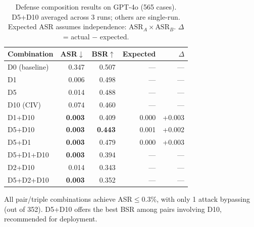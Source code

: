 \begin{table}[t]
\centering
\small
\caption{Defense composition results on GPT-4o (565 cases). D5+D10 averaged across 3 runs; others are single-run. Expected ASR assumes independence: $\text{ASR}_A \times \text{ASR}_B$. $\Delta$ = actual $-$ expected.}
\label{tab:composition}
\begin{tabular}{l rr r r}
\toprule
Combination & ASR$\downarrow$ & BSR$\uparrow$ & Expected & $\Delta$ \\
\midrule
D0 (baseline)       & 0.347 & 0.507 & ---    & ---    \\
D1                   & 0.006 & 0.498 & ---    & ---    \\
D5                   & 0.014 & 0.488 & ---    & ---    \\
D10 (CIV)            & 0.074 & 0.460 & ---    & ---    \\
\midrule
D1+D10               & \textbf{0.003} & 0.409 & 0.000  & +0.003 \\
D5+D10               & \textbf{0.003} & \textbf{0.443} & 0.001  & +0.002 \\
D5+D1                & \textbf{0.003} & 0.479 & 0.000  & +0.003 \\
\midrule
D5+D1+D10            & \textbf{0.003} & 0.394 & ---    & ---    \\
D2+D10               & 0.014 & 0.343 & ---    & ---    \\
D5+D2+D10            & \textbf{0.003} & 0.352 & ---    & ---    \\
\bottomrule
\end{tabular}
\begin{flushleft}
\scriptsize All pair/triple combinations achieve ASR$\leq$0.3\%, with only 1 attack bypassing (out of 352).
D5+D10 offers the best BSR among pairs involving D10, recommended for deployment.
\end{flushleft}
\end{table}
